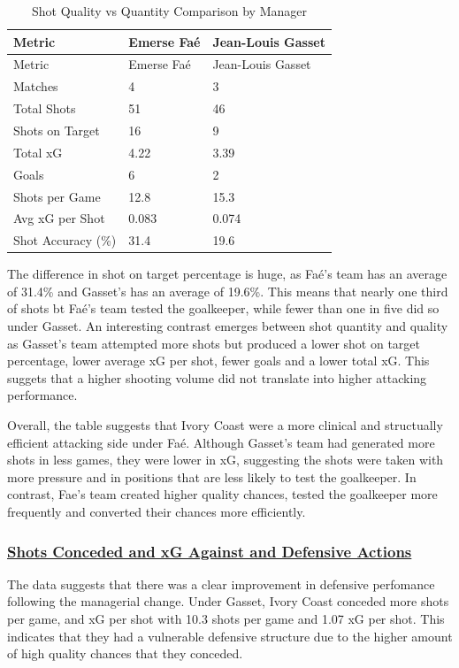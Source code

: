 \documentclass[
  11pt,
  letterpaper,
  DIV=11,
  numbers=noendperiod]{scrartcl}
\begin{document}
\begin{longtable}[]{@{}lll@{}}
\caption{Shot Quality vs Quantity Comparison by Manager}\tabularnewline
\toprule\noalign{}
Metric & Emerse Faé & Jean-Louis Gasset \\
\midrule\noalign{}
\endfirsthead
\toprule\noalign{}
Metric & Emerse Faé & Jean-Louis Gasset \\
\midrule\noalign{}
\endhead
\bottomrule\noalign{}
\endlastfoot
Matches & 4 & 3 \\
Total Shots & 51 & 46 \\
Shots on Target & 16 & 9 \\
Total xG & 4.22 & 3.39 \\
Goals & 6 & 2 \\
Shots per Game & 12.8 & 15.3 \\
Avg xG per Shot & 0.083 & 0.074 \\
Shot Accuracy (\%) & 31.4 & 19.6 \\
\end{longtable}

The difference in shot on target percentage is huge, as Faé's team has
an average of 31.4\% and Gasset's has an average of 19.6\%. This means
that nearly one third of shots bt Faé's team tested the goalkeeper,
while fewer than one in five did so under Gasset. An interesting
contrast emerges between shot quantity and quality as Gasset's team
attempted more shots but produced a lower shot on target percentage,
lower average xG per shot, fewer goals and a lower total xG. This
suggets that a higher shooting volume did not translate into higher
attacking performance.

Overall, the table suggests that Ivory Coast were a more clinical and
structually efficient attacking side under Faé. Although Gasset's team
had generated more shots in less games, they were lower in xG,
suggesting the shots were taken with more pressure and in positions that
are less likely to test the goalkeeper. In contrast, Fae's team created
higher quality chances, tested the goalkeeper more frequently and
converted their chances more efficiently.

\subsubsection{\texorpdfstring{\ul{Shots Conceded and xG Against and
Defensive
Actions}}{Shots Conceded and xG Against and Defensive Actions}}\label{shots-conceded-and-xg-against-and-defensive-actions}

The data suggests that there was a clear improvement in defensive
perfomance following the managerial change. Under Gasset, Ivory Coast
conceded more shots per game, and xG per shot with 10.3 shots per game
and 1.07 xG per shot. This indicates that they had a vulnerable
defensive structure due to the higher amount of high quality chances
that they conceded.
\end{document}
